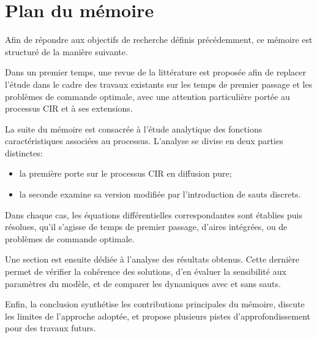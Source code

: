 \section{Plan du mémoire}  %
Afin de répondre aux objectifs de recherche définis précédemment, ce mémoire est structuré de la manière suivante.

Dans un premier temps, une revue de la littérature est proposée afin de replacer l'étude dans le cadre des travaux existants sur les temps de premier passage et les problèmes de commande optimale, avec une attention particulière portée au processus \acs{CIR} et à ses extensions.

La suite du mémoire est consacrée à l'étude analytique des fonctions caractéristiques associées au processus. L'analyse se divise en deux parties distinctes: 
\begin{itemize}
    \item la première porte sur le processus \acs{CIR} en diffusion pure;
    \item la seconde examine sa version modifiée par l'introduction de sauts discrets.
\end{itemize}
Dans chaque cas, les équations différentielles correspondantes sont établies puis résolues, qu'il s'agisse de temps de premier passage, d'aires intégrées, ou de problèmes de commande optimale.

Une section est ensuite dédiée à l'analyse des résultats obtenus. Cette dernière permet de vérifier la cohérence des solutions, d'en évaluer la sensibilité aux paramètres du modèle, et de comparer les dynamiques avec et sans sauts.

Enfin, la conclusion synthétise les contributions principales du mémoire, discute les limites de l'approche adoptée, et propose plusieurs pistes d'approfondissement pour des travaux futurs.


